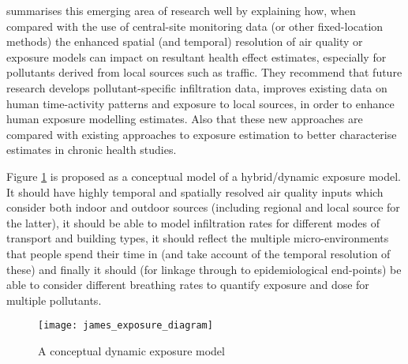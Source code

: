 \cite{Baxter2013} summarises this emerging area of research well by explaining how, when compared with the use of central-site monitoring data (or other fixed-location methods) the enhanced spatial (and temporal) resolution of air quality or exposure models can impact on resultant health effect estimates, especially for pollutants derived from local sources such as traffic.  They recommend that future research develops pollutant-specific infiltration data, improves existing data on human time-activity patterns and exposure to local sources, in order to enhance human exposure modelling estimates. Also that these new approaches are compared with existing approaches to exposure estimation to better characterise estimates in chronic health studies.

\vspace{1cm}
Figure \ref{fig:james_exposure_diagram} is proposed as a conceptual model of a hybrid/dynamic exposure model. It should have highly temporal and spatially resolved air quality inputs which consider both indoor and outdoor sources (including regional and local source for the latter), it should be able to model infiltration rates for different modes of transport and building types, it should reflect the multiple micro-environments that people spend their time in (and take account of the temporal resolution of these) and finally it should (for linkage through to epidemiological end-points) be able to consider different breathing rates to quantify exposure and dose for multiple pollutants.

\begin{figure}[H]
\centering
\texttt{[image: james\_exposure\_diagram]}
\caption{A conceptual dynamic exposure model}
\label{fig:james_exposure_diagram}
\end{figure}